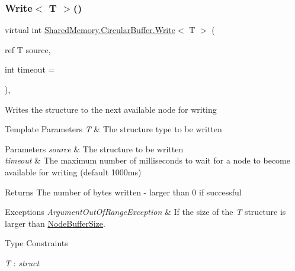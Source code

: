 \subsubsection{\texorpdfstring{Write$<$ T $>$()}{Write< T >()}\hspace{0.1cm}{\footnotesize\ttfamily [2/2]}}
{\footnotesize\ttfamily virtual int \hyperlink{class_shared_memory_1_1_circular_buffer_a988b37e45afb8a8576041ed350407a0a}{Shared\+Memory.\+Circular\+Buffer.\+Write}$<$ T $>$ (\begin{DoxyParamCaption}\item[{ref T}]{source,  }\item[{int}]{timeout = {} }\end{DoxyParamCaption})\hspace{0.3cm}{\ttfamily [inline]}, {\ttfamily [virtual]}}



Writes the structure to the next available node for writing 


\begin{DoxyTemplParams}{Template Parameters}
{\em T} & The structure type to be written\\
\hline
\end{DoxyTemplParams}

\begin{DoxyParams}{Parameters}
{\em source} & The structure to be written\\
\hline
{\em timeout} & The maximum number of milliseconds to wait for a node to become available for writing (default 1000ms)\\
\hline
\end{DoxyParams}
\begin{DoxyReturn}{Returns}
The number of bytes written -\/ larger than 0 if successful
\end{DoxyReturn}

\begin{DoxyExceptions}{Exceptions}
{\em Argument\+Out\+Of\+Range\+Exception} & If the size of the {\itshape T}  structure is larger than \hyperlink{class_shared_memory_1_1_circular_buffer_a25a6c6b560e818ef1ba6d645e0e14018}{Node\+Buffer\+Size}.\\
\hline
\end{DoxyExceptions}
\begin{Desc}
\item[Type Constraints]\begin{description}
\item[{\em T} : {\em struct}]\end{description}
\end{Desc}


